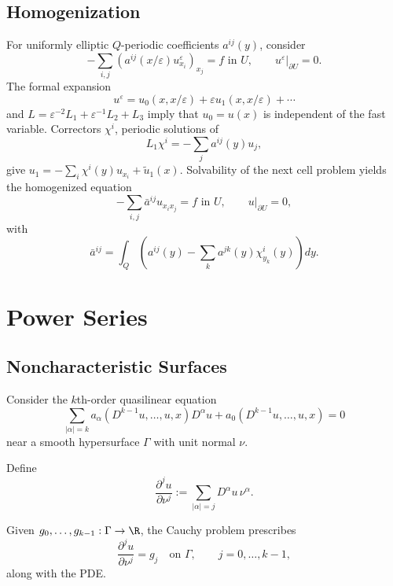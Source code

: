 \subsection{Homogenization}
\label{sec:homogenization}

\begin{example}
\label{ex:periodic-homogenization-elliptic}
For uniformly elliptic $Q$-periodic coefficients $a^{ij}(y)$, consider
\[
-\sum_{i,j}(a^{ij}(x/\varepsilon)u^\varepsilon_{x_i})_{x_j}=f\text{ in }U,
\qquad u^\varepsilon|_{\partial U}=0.
\]
The formal expansion
\[
u^\varepsilon=u_0(x,x/\varepsilon)+\varepsilon u_1(x,x/\varepsilon)+\cdots
\]
and $L=\varepsilon^{-2}L_1+\varepsilon^{-1}L_2+L_3$ imply that $u_0=u(x)$
is independent of the fast variable. Correctors $\chi^i$, periodic solutions
of
\[
L_1\chi^i=-\sum_j a^{ij}(y)u_j,
\]
give $u_1=-\sum_i\chi^i(y)u_{x_i}+\tilde u_1(x)$. Solvability of the next
cell problem yields the homogenized equation
\[
-\sum_{i,j}\bar a^{ij}u_{x_ix_j}=f\text{ in }U,\qquad u|_{\partial U}=0,
\]
with
\[
\bar a^{ij}=\int_Q\left(a^{ij}(y)-\sum_k a^{jk}(y)\chi^i_{y_k}(y)\right)dy.
\]
\end{example}

\section{Power Series}
\label{sec:power-series}

\subsection{Noncharacteristic Surfaces}
\label{sec:noncharacteristic-surfaces}

Consider the $k$th-order quasilinear equation
\[
\sum_{|\alpha|=k}a_\alpha(D^{k-1}u,\ldots,u,x)D^\alpha u+a_0(D^{k-1}u,\ldots,u,x)=0
\]
near a smooth hypersurface $\Gamma$ with unit normal $\nu$.

\begin{definition}
\label{def:normal-derivative-notation}
Define
\[
\frac{\partial^ju}{\partial\nu^j}:=
\sum_{|\alpha|=j}D^\alpha u\,\nu^\alpha.
\]
\end{definition}

\begin{definition}
\label{def:cauchy-problem-cauchy-data}
Given $g_0,\ldots,g_{k-1}:\Gamma\to\R$, the Cauchy problem prescribes
\[
\frac{\partial^ju}{\partial\nu^j}=g_j\quad\text{on }\Gamma,
\qquad j=0,\ldots,k-1,
\]
along with the PDE.
\end{definition}

